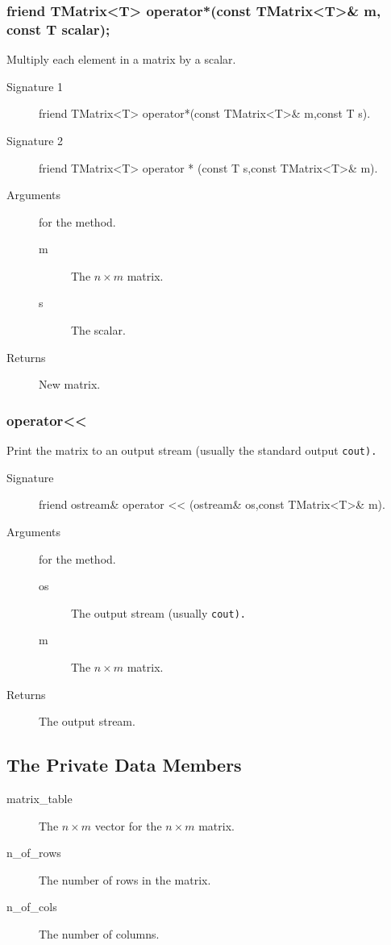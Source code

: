 \subsubsection{friend TMatrix<T> operator*(const TMatrix<T>\& m,\\
    	                                   const T scalar);}
Multiply each element in a matrix by a scalar.
\begin{description}
  \item[Signature 1] friend TMatrix<T> operator*(const TMatrix<T>\&
  m,const T s).
  \item[Signature 2] friend TMatrix<T> operator * (const T s,const
  TMatrix<T>\& m).
  \item[Arguments] for the method.
   \begin{description}
     \item [m] The $n \times m$ matrix.
     \item [s] The scalar.
   \end{description} 
  \item [Returns] New matrix.
\end{description}

\subsubsection{operator<<}
Print the matrix to an output stream (usually the standard output \tt cout\rm).

\begin{description}
  \item[Signature] friend ostream\& operator << (ostream\& os,const TMatrix<T>\& m).
  \item[Arguments] for the method.
   \begin{description}
     \item [os] The output stream (usually \tt cout\rm).
     \item [m] The $n \times m$ matrix.
   \end{description} 
  \item [Returns] The output stream.
\end{description}

\subsection{The Private Data Members}

\begin{description}
  \item [matrix\_table] The $n \times m$ vector for the  
                           $n \times m$ matrix.
  \item [n\_of\_rows] The number of rows in the matrix.
  \item [n\_of\_cols] The number of columns.
\end{description}

